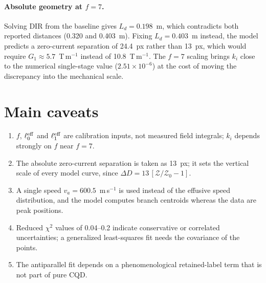 \documentclass[11pt,a4paper]{article}
\newcommand{\Z}{\mathcal{Z}}
\newcommand{\DIR}{\mathrm{DIR}}
\begin{document}
\paragraph{Absolute geometry at $f=7$.} Solving $\DIR$ from the baseline gives $L_d=0.198$~m, which
contradicts both reported distances (0.320 and 0.403~m). Fixing $L_d=0.403$~m instead, the model
predicts a zero-current separation of 24.4~px rather than 13~px, which would require
$G_1\approx5.7$~T\,m$^{-1}$ instead of 10.8~T\,m$^{-1}$. The $f=7$ scaling brings $k_i$ close to the
numerical single-stage value ($2.51\times10^{-6}$) at the cost of moving the discrepancy into the
mechanical scale.

\section{Main caveats}
\begin{enumerate}
\item $f$, $\ell_0^{\rm eff}$ and $\ell_1^{\rm eff}$ are calibration inputs, not measured field integrals;
$k_i$ depends strongly on $f$ near $f=7$.
\item The absolute zero-current separation is taken as 13~px; it sets the vertical scale of every model
curve, since $\Delta D=13\,[\Z/\Z_0-1]$.
\item A single speed $v_a=600.5$~m\,s$^{-1}$ is used instead of the effusive speed distribution, and the
model computes branch centroids whereas the data are peak positions.
\item Reduced $\chi^2$ values of 0.04--0.2 indicate conservative or correlated uncertainties; a
generalized least-squares fit needs the covariance of the points.
\item The antiparallel fit depends on a phenomenological retained-label term that is not part of pure
CQD.
\end{enumerate}

\appendix
\end{document}
